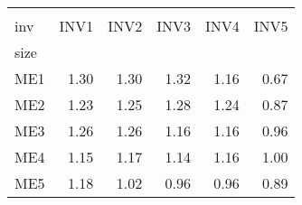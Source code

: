 \begin{tabular}{lrrrrr}
\toprule
{} \\
inv &  INV1 &  INV2 &  INV3 &  INV4 &  INV5 \\
size &       &       &       &       &       \\
\midrule
ME1  &  1.30 &  1.30 &  1.32 &  1.16 &  0.67 \\
ME2  &  1.23 &  1.25 &  1.28 &  1.24 &  0.87 \\
ME3  &  1.26 &  1.26 &  1.16 &  1.16 &  0.96 \\
ME4  &  1.15 &  1.17 &  1.14 &  1.16 &  1.00 \\
ME5  &  1.18 &  1.02 &  0.96 &  0.96 &  0.89 \\
\bottomrule
\end{tabular}
